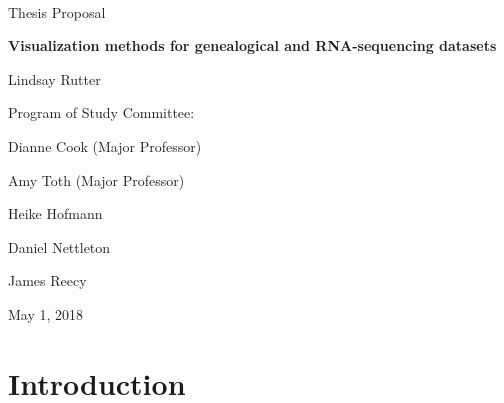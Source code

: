 \documentclass[11pt,a4paper,oldfontcommands,openany]{memoir}
\numberwithin{equation}{section} %
\begin{document}
\sloppy


{
\centering
~\vspace{\fill}

\vspace{2.5cm}

{\LARGE Thesis Proposal}

\vspace{1cm}

{\LARGE\textbf{Visualization methods for genealogical and RNA-sequencing datasets}}

\vspace{1cm}

{\LARGE Lindsay Rutter}

\vspace{4cm}

{\LARGE Program of Study Committee:}

\vspace{1cm}

{\LARGE Dianne Cook (Major Professor)}

\vspace{.25cm}

{\LARGE Amy Toth (Major Professor)}

\vspace{.25cm}

{\LARGE Heike Hofmann}

\vspace{.25cm}

{\LARGE Daniel Nettleton}

\vspace{.25cm}

{\LARGE James Reecy}

\vspace{2.5cm}

{\centerline{\large May 1, 2018}}
}

\clearpage

\setsecheadstyle{\Large\bfseries\sffamily\raggedright}
\setsubsecheadstyle{\large\bfseries\sffamily\raggedright}
\setsubsubsecheadstyle{\bfseries\sffamily\raggedright}

\tableofcontents

\setlength{\parskip}{10pt} %

\OnehalfSpacing

\chapter{Introduction}
\end{document}
